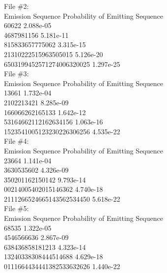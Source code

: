 \begin{subsolution}
{File \#2:\\
Emission Sequence             Probability of Emitting Sequence\\
60622                         2.088e-05\\
4687981156                    5.181e-11\\
815833657775062               3.315e-15\\
21310222515963505015          5.126e-20\\
6503199452571274006320025     1.297e-25\\


File \#3:\\
Emission Sequence             Probability of Emitting Sequence\\
13661                         1.732e-04\\
2102213421                    8.285e-09\\
166066262165133               1.642e-12\\
53164662112162634156          1.063e-16\\
1523541005123230226306256     4.535e-22\\


File \#4:\\
Emission Sequence             Probability of Emitting Sequence\\
23664                         1.141e-04\\
3630535602                    4.326e-09\\
350201162150142               9.793e-14\\
00214005402015146362          4.740e-18\\
2111266524665143562534450     5.618e-22\\


File \#5:\\
Emission Sequence             Probability of Emitting Sequence\\
68535                         1.322e-05\\
4546566636                    2.867e-09\\
638436858181213               4.323e-14\\
13240338308444514688          4.629e-18\\
0111664434441382533632626     1.440e-22
}\end{subsolution}
\clearpage

